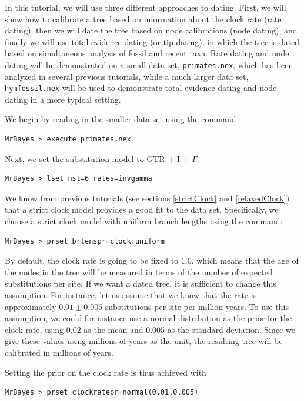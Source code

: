 \documentclass[12pt]{book}
\newcommand{\ttt}[1]{\texttt{#1}}
\begin{document}
In this tutorial, we will use three different approaches to dating. First, we will show how to
calibrate a tree based on information about the clock rate (rate dating), then we will date the
tree based on node calibrations (node dating), and finally we will use total-evidence dating (or
tip dating), in which the tree is dated based on simultaneous analysis of fossil and recent taxa.
Rate dating and node dating will be demonstrated on a small data set, \ttt{primates.nex}, which
has been analyzed in several previous tutorials, while a much larger data set,
\ttt{hymfossil.nex} will be used to demonstrate total-evidence dating and node dating in a more
typical setting.

We begin by reading in the smaller data set using the command

\begin{verbatim}
MrBayes > execute primates.nex
\end{verbatim}

Next, we set the substitution model to GTR + I + $\Gamma$:

\begin{verbatim}
MrBayes > lset nst=6 rates=invgamma
\end{verbatim}

We know from previous tutorials (see sections \ref{strictClock} and \ref{relaxedClock}) that a
strict clock model provides a good fit to the data set. Specifically, we choose a strict clock
model with uniform branch lengths using the command:

\begin{verbatim}
MrBayes > prset brlenspr=clock:uniform
\end{verbatim}

By default, the clock rate is going to be fixed to $1.0$, which means that the age of the nodes in
the tree will be measured in terms of the number of expected substitutions per site. If we want a
dated tree, it is sufficient to change this assumption. For instance, let us assume that we know
that the rate is approximately $0.01 \pm 0.005$ substitutions per site per million years. To use
this assumption, we could for instance use a normal distribution as the prior for the clock rate,
using $0.02$ as the mean and $0.005$ as the standard deviation. Since we give these values using
millions of years as the unit, the resulting tree will be calibrated in millions of years.

Setting the prior on the clock rate is thus achieved with

\begin{verbatim}
MrBayes > prset clockratepr=normal(0.01,0.005)
\end{verbatim}
\end{document}
